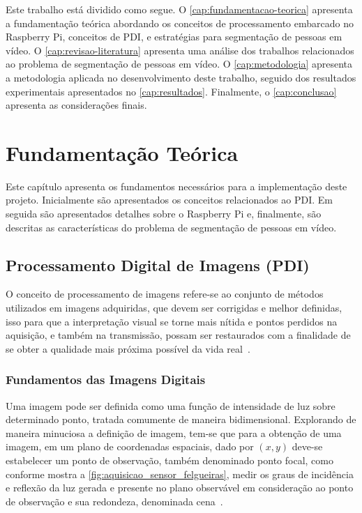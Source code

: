 \documentclass[12pt,oneside,a4paper,chapter=TITLE,section=TITLE,sumario=tradicional]{abntex2}
\begin{document}
Este trabalho está dividido como segue. O \autoref{cap:fundamentacao-teorica} apresenta a fundamentação teórica abordando os conceitos de processamento embarcado no Raspberry Pi, conceitos de PDI, e estratégias para segmentação de pessoas em vídeo. O \autoref{cap:revisao-literatura} apresenta uma análise dos trabalhos relacionados ao problema de segmentação de pessoas em vídeo. O \autoref{cap:metodologia} apresenta a metodologia aplicada no desenvolvimento deste trabalho, seguido dos resultados experimentais apresentados no \autoref{cap:resultados}. Finalmente, o \autoref{cap:conclusao} apresenta as considerações finais.


\chapter{Fundamentação Teórica}
\label{cap:fundamentacao-teorica}

Este capítulo apresenta os fundamentos necessários para a implementação deste projeto. Inicialmente são apresentados os conceitos relacionados ao PDI. Em seguida são apresentados detalhes sobre o Raspberry Pi e, finalmente, são descritas as características do problema de segmentação de pessoas em vídeo.


\section{Processamento Digital de Imagens (PDI)}
\label{sec:pdi}

O conceito de processamento de imagens refere-se ao conjunto de métodos utilizados em imagens adquiridas, que devem ser corrigidas e melhor definidas, isso para que a interpretação visual se torne mais nítida e pontos perdidos na aquisição, e também na transmissão, possam ser restaurados com a finalidade de se obter a qualidade mais próxima possível da vida real~\cite{pdi2006}.

\subsection{Fundamentos das Imagens Digitais}

Uma imagem pode ser definida como uma função de intensidade de luz sobre determinado ponto, tratada comumente de maneira bidimensional. Explorando de maneira minuciosa a definição de imagem, tem-se que para a obtenção de uma imagem, em um plano de coordenadas espaciais, dado por $(x, y)$ deve-se estabelecer um ponto de observação, também denominado ponto focal, como conforme mostra a \autoref{fig:aquisicao_sensor_felgueiras}, medir os graus de incidência e reflexão da luz gerada e presente no plano observável em consideração ao ponto de observação e sua redondeza, denominada cena~\cite{pdi2006}.
\end{document}
